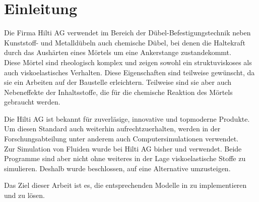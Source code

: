 \section{Einleitung}
\label{Kapitel:Einleitung}
Die Firma Hilti AG verwendet im Bereich der Dübel-Befestigungstechnik neben Kunststoff- und Metalldübeln auch chemische Dübel, bei denen die Haltekraft durch das Aushärten eines Mörtels um eine Ankerstange zustandekommt. \\
Diese Mörtel sind rheologisch komplex und zeigen sowohl ein struktuviskoses als auch viskoelastisches Verhalten. Diese Eigenschaften sind teilweise gewünscht, da sie ein Arbeiten auf der Baustelle erleichtern. Teilweise sind sie aber auch Nebeneffekte der Inhaltsstoffe, die für die chemische Reaktion des Mörtels gebraucht werden.

Die Hilti AG ist bekannt für zuverläsige, innovative und topmoderne Produkte. Um diesen Standard auch weiterhin aufrechtzuerhalten, werden in der Forschungsabteilung unter anderem auch Computersimulationen verwendet. \\
Zur Simulation von Fluiden wurde bei Hilti AG bisher \comsol{} und \cfx{} verwendet. Beide Programme sind aber nicht ohne weiteres in der Lage viskoelastische Stoffe zu simulieren. Deshalb wurde beschlossen, auf eine Alternative umzusteigen.

Das Ziel dieser Arbeit ist es, die entsprechenden Modelle in \openfoam{} zu implementieren und zu lösen.
